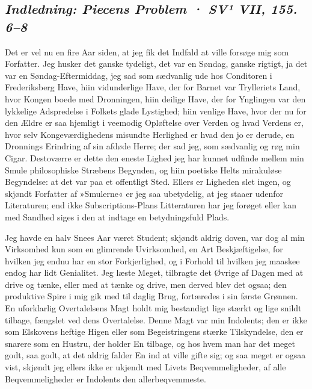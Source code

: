 \documentclass[12pt,a4paper]{article}
\newcommand{\sectionheading}[1]{\subsection*{\normalfont\itshape #1}}
\begin{document}
\sectionheading{Indledning: Piecens Problem  ·  SV¹ VII, 155. 6–8}

Det er vel nu en fire Aar siden, at jeg fik det Indfald at ville forsøge mig som Forfatter. Jeg husker det ganske tydeligt, det var en Søndag, ganske rigtigt, ja det var en Søndag-Eftermiddag, jeg sad som sædvanlig ude hos Conditoren i Frederiksberg Have, hiin vidunderlige Have, der for Barnet var Trylleriets Land, hvor Kongen boede med Dronningen, hiin deilige Have, der for Ynglingen var den lykkelige Adspredelse i Folkets glade Lystighed; hiin venlige Have, hvor der nu for den Ældre er saa hjemligt i veemodig Opløftelse over Verden og hvad Verdens er, hvor selv Kongeværdighedens misundte Herlighed er hvad den jo er derude, en Dronnings Erindring af sin afdøde Herre; der sad jeg, som sædvanlig og røg min Cigar. Destoværre er dette den eneste Lighed jeg har kunnet udfinde mellem min Smule philosophiske Stræbens Begynden, og hiin poetiske Helts mirakuløse Begyndelse: at det var paa et offentligt Sted. Ellers er Ligheden slet ingen, og skjøndt Forfatter af »Smulerne« er jeg saa ubetydelig, at jeg staaer udenfor Literaturen; end ikke Subscriptions-Plans Litteraturen har jeg forøget eller kan med Sandhed siges i den at indtage en betydningsfuld Plads.

Jeg havde en halv Snees Aar været Student; skjøndt aldrig doven, var dog al min Virksomhed kun som en glimrende Uvirksomhed, en Art Beskjæftigelse, for hvilken jeg endnu har en stor Forkjerlighed, og i Forhold til hvilken jeg maaskee endog har lidt Genialitet. Jeg læste Meget, tilbragte det Øvrige af Dagen med at drive og tænke, eller med at tænke og drive, men derved blev det ogsaa; den produktive Spire i mig gik med til daglig Brug, fortæredes i sin første Grønnen. En uforklarlig Overtalelsens Magt holdt mig bestandigt lige stærkt og lige snildt tilbage, fængslet ved dens Overtalelse. Denne Magt var min Indolents; den er ikke som Elskovens heftige Higen eller som Begeistringens stærke Tilskyndelse, den er snarere som en Hustru, der holder En tilbage, og hos hvem man har det meget godt, saa godt, at det aldrig falder En ind at ville gifte sig; og saa meget er ogsaa vist, skjøndt jeg ellers ikke er ukjendt med Livets Beqvemmeligheder, af alle Beqvemmeligheder er Indolents den allerbeqvemmeste.
\end{document}
